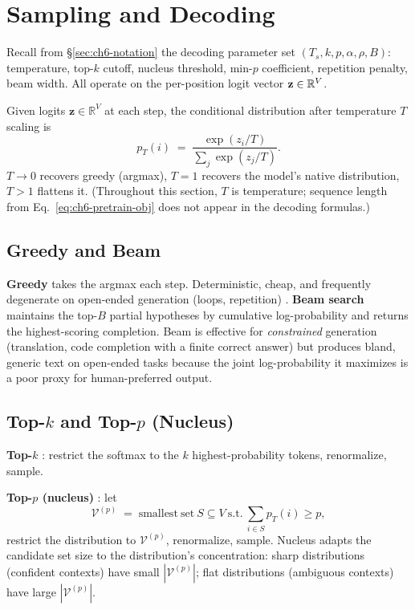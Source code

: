 \section{Sampling and Decoding}

Recall from \S\ref{sec:ch6-notation} the decoding parameter set
$(T_s, k, p, \alpha, \rho, B)$: temperature, top-$k$ cutoff, nucleus
threshold, min-$p$ coefficient, repetition penalty, beam width. All
operate on the per-position logit vector $\mathbf{z} \in \mathbb{R}^{V}$.

Given logits $\mathbf{z} \in \mathbb{R}^V$ at each step, the
conditional distribution after temperature $T$ scaling is
\begin{equation}
\label{eq:ch6-softmax-temp}
p_T(i) \;=\; \frac{\exp(z_i / T)}{\sum_j \exp(z_j / T)}.
\end{equation}
$T \to 0$ recovers greedy (argmax), $T = 1$ recovers the model's
native distribution, $T > 1$ flattens it. (Throughout this section,
$T$ is temperature; sequence length from
Eq.~\eqref{eq:ch6-pretrain-obj} does not appear in the decoding
formulas.)

\subsection{Greedy and Beam}

\textbf{Greedy} takes the argmax each step. Deterministic, cheap, and
frequently degenerate on open-ended generation (loops, repetition)
\citep{holtzman2020curious}. \textbf{Beam search} maintains the
top-$B$ partial hypotheses by cumulative log-probability and returns
the highest-scoring completion. Beam is effective for
\emph{constrained} generation (translation, code completion with a
finite correct answer) but produces bland, generic text on open-ended
tasks because the joint log-probability it maximizes is a poor
proxy for human-preferred output.

\subsection{\texorpdfstring{Top-$k$ and Top-$p$ (Nucleus)}{Top-k and Top-p (Nucleus)}}

\textbf{Top-$k$} \citep{fan2018hierarchical}: restrict the softmax to
the $k$ highest-probability tokens, renormalize, sample.

\textbf{Top-$p$ (nucleus)} \citep{holtzman2020curious}: let
\begin{equation}
\label{eq:ch6-nucleus}
\mathcal{V}^{(p)}
 \;=\; \mathrm{smallest~set}\ S \subseteq V
       \ \mathrm{s.t.}\ \sum_{i \in S} p_T(i) \ge p,
\end{equation}
restrict the distribution to $\mathcal{V}^{(p)}$, renormalize,
sample. Nucleus adapts the candidate set size to the distribution's
concentration: sharp distributions (confident contexts) have small
$|\mathcal{V}^{(p)}|$; flat distributions (ambiguous contexts) have
large $|\mathcal{V}^{(p)}|$.

